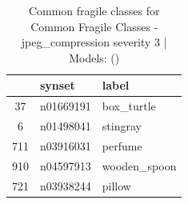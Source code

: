 \begin{table}
\caption{Common fragile classes for Common Fragile Classes - jpeg_compression severity 3 | Models: ()}
\label{tab:Common Fragile Classes - jpeg_compression severity 3_d41d8cd9}
\begin{tabular}{cll}
\toprule
 & synset & label \\
\midrule
37 & n01669191 & box_turtle \\
6 & n01498041 & stingray \\
711 & n03916031 & perfume \\
910 & n04597913 & wooden_spoon \\
721 & n03938244 & pillow \\
\bottomrule
\end{tabular}
\end{table}
